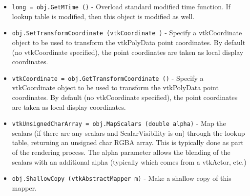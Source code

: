 \begin{itemize}
\item  \verb|long = obj.GetMTime ()| -  Overload standard modified time function. If lookup table is modified,
 then this object is modified as well.

\item  \verb|obj.SetTransformCoordinate (vtkCoordinate )| -  Specify a vtkCoordinate object to be used to transform the vtkPolyData
 point coordinates. By default (no vtkCoordinate specified), the point 
 coordinates are taken as local display coordinates.

\item  \verb|vtkCoordinate = obj.GetTransformCoordinate ()| -  Specify a vtkCoordinate object to be used to transform the vtkPolyData
 point coordinates. By default (no vtkCoordinate specified), the point 
 coordinates are taken as local display coordinates.

\item  \verb|vtkUnsignedCharArray = obj.MapScalars (double alpha)| -  Map the scalars (if there are any scalars and ScalarVisibility is on)
 through the lookup table, returning an unsigned char RGBA array. This is
 typically done as part of the rendering process. The alpha parameter 
 allows the blending of the scalars with an additional alpha (typically
 which comes from a vtkActor, etc.)

\item  \verb|obj.ShallowCopy (vtkAbstractMapper m)| -  Make a shallow copy of this mapper.

\end{itemize}
